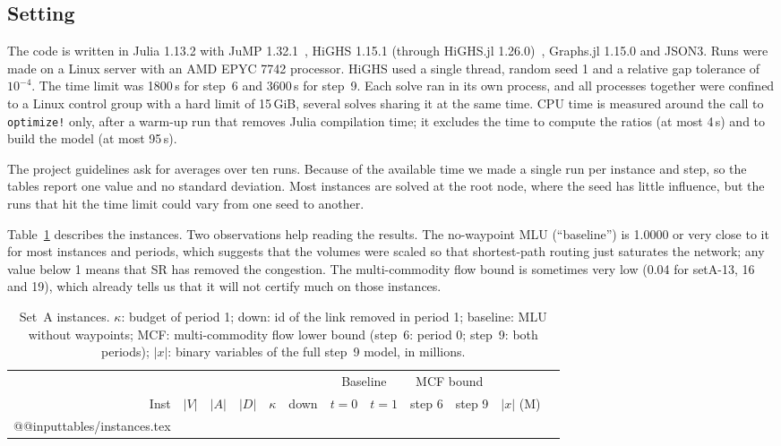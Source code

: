 \documentclass[11pt,a4paper]{article}
\begin{document}
\subsection{Setting}

The code is written in Julia 1.13.2 with JuMP 1.32.1~\cite{jump2023}, HiGHS 1.15.1 (through
HiGHS.jl 1.26.0)~\cite{highs2018}, Graphs.jl 1.15.0 and JSON3. Runs were made on a Linux server with
an AMD EPYC 7742 processor. HiGHS used a single thread, random seed 1 and a relative gap tolerance of
$10^{-4}$. The time limit was 1800\,s for step~6 and 3600\,s for step~9. Each solve ran in its own
process, and all processes together were confined to a Linux control group with a hard limit of
15\,GiB, several solves sharing it at the same time. CPU time is measured around the call to
\texttt{optimize!} only, after a warm-up run that removes Julia compilation time; it excludes the
time to compute the ratios (at most 4\,s) and to build the model (at most 95\,s).

The project guidelines ask for averages over ten runs. Because of the available time we made a single
run per instance and step, so the tables report one value and no standard deviation. Most instances
are solved at the root node, where the seed has little influence, but the runs that hit the time
limit could vary from one seed to another.

Table~\ref{tab:instances} describes the instances. Two observations help reading the results. The
no-waypoint MLU (``baseline'') is 1.0000 or very close to it for most instances and periods, which
suggests that the volumes were scaled so that shortest-path routing just saturates the network; any
value below 1 means that SR has removed the congestion. The multi-commodity flow bound is sometimes
very low (0.04 for setA-13, 16 and 19), which already tells us that it will not certify much on
those instances.

\begin{table}[tbp]
\centering\small
\caption{Set~A instances. $\kappa$: budget of period 1; down: id of the link removed in period 1;
baseline: MLU without waypoints; MCF: multi-commodity flow lower bound (step~6: period 0; step~9:
both periods); $|x|$: binary variables of the full step~9 model, in millions.}\label{tab:instances}
\setlength{\tabcolsep}{5pt}
\begin{tabular}{@{}rrrrrrcccccr@{}}
\toprule
 & & & & & & \multicolumn{2}{c}{Baseline} & \multicolumn{2}{c}{MCF bound} & \\
\cmidrule(lr){7-8}\cmidrule(lr){9-10}
Inst & $|V|$ & $|A|$ & $|D|$ & $\kappa$ & down & $t=0$ & $t=1$ & step 6 & step 9 & $|x|$ (M)\\
\midrule
\csname @@input\endcsname tables/instances.tex 
\bottomrule
\end{tabular}
\end{table}
\end{document}
